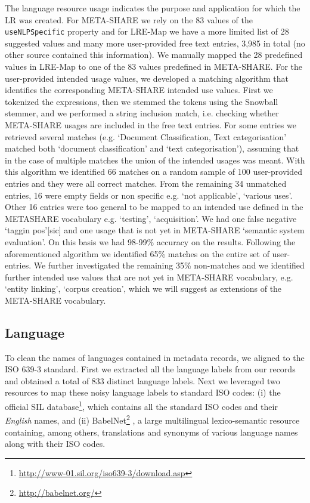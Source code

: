 \documentclass[11pt]{article}
\begin{document}
The language resource usage indicates the purpose and application for which 
the LR was created. For META-SHARE we rely on the 83 values of the 
{\tt useNLPSpecific} property and for LRE-Map we have a more limited list 
of 28 suggested values and many more user-provided free text entries, 3,985 in
total (no other source contained this information). We manually mapped the 28 predefined values in LRE-Map to one of the 83 values predefined in META-SHARE.
For the user-provided intended usage values, we developed a matching algorithm that identifies the 
corresponding META-SHARE intended use values. First we tokenized the expressions, then we
stemmed the tokens using the Snowball stemmer, and we performed a string
inclusion match, i.e. checking whether META-SHARE usages are included in the
free text entries. For some entries we retrieved several matches (e.g.
`Document Classification, Text categorisation' matched both
`document classification' and `text 
categorisation'), assuming that in the case of multiple matches the union of the intended usages was meant.
With this algorithm we identified 66 matches on a random sample of 100 user-provided entries and they were all correct matches. From 
the remaining 34 unmatched entries, 16 were empty fields or non specific e.g. 
`not applicable', `various uses'. Other 16 entries were too general to be 
mapped to an intended use defined in the METASHARE vocabulary e.g. `testing', `acquisition'. We had one 
false negative `taggin pos'[sic] and one usage that is not yet in META-SHARE `semantic system evaluation'. On this basis we had 98-99\% accuracy on the results.
Following the aforementioned algorithm we identified 65\% matches on the entire 
set of user-entries. We further investigated the remaining 35\% non-matches and 
we identified further intended use values that are not yet in META-SHARE vocabulary, e.g. 
`entity linking', `corpus creation', which we will suggest as extensions of the META-SHARE 
vocabulary.

    
\subsection{Language}

To clean the names of languages contained in metadata records, we aligned
to the ISO 639-3 standard. First we extracted all the language labels
from our records and obtained a total of 833 distinct language labels. Next we
leveraged two resources to map these noisy language labels to standard ISO
codes: (i) the official SIL
database\footnote{\url{http://www-01.sil.org/iso639-3/download.asp}}, which
contains all the standard ISO codes and their \textit{English} names, and (ii) BabelNet\footnote{\url{http://babelnet.org/}} \cite{NavigliPonzetto:12aij}, a large multilingual lexico-semantic resource containing, among others, translations and synonyms of various language names along with their ISO codes. 
\end{document}
